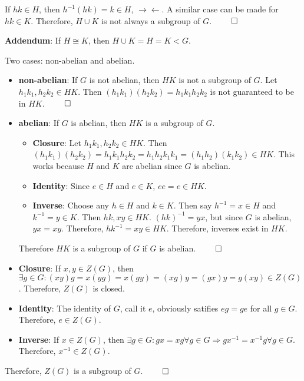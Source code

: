\documentclass[12pt]{report}
\begin{document}
If $hk \in H$, then $h^{-1}(hk) = k \in H$, $\rightarrow \leftarrow$. A similar case can be made for $hk \in K$.  Therefore, $H \cup K$ is not always a subgroup of $G$. $\qed$

\textbf{Addendum}: If $H \cong K$, then $H \cup K = H = K < G$.

\sol Two cases: non-abelian and abelian.
\begin{itemize}
    \item \textbf{non-abelian}: If $G$ is not abelian, then $HK$ is not a subgroup of $G$. Let $h_1k_1, h_2k_2 \in HK$. Then $(h_1k_1)(h_2k_2) = h_1k_1h_2k_2$ is not guaranteed to be in $HK$. $\qed$
    \item \textbf{abelian}: If $G$ is abelian, then $HK$ is a subgroup of $G$.
    \begin{itemize}
        \item \textbf{Closure}:  Let $h_1k_1, h_2k_2 \in HK$. Then $(h_1k_1)(h_2k_2) = h_1k_1h_2k_2 = h_1h_2k_1k_1 = (h_1h_2)(k_1k_2) \in HK$. This works because $H$ and $K$ are abelian since $G$ is abelian.
        \item \textbf{Identity}: Since $e \in H$ and $e \in K$, $ee = e \in HK$.
        \item \textbf{Inverse}: Choose any $h \in H$ and $k \in K$. Then say $h^{-1} = x \in H$ and $k^{-1} = y \in K$. Then $hk, xy \in HK$. $(hk)^{-1} = yx$, but since $G$ is abelian, $yx = xy$. Therefore, $hk^{-1} = xy \in HK$. Therefore, inverses exist in $HK$.
    \end{itemize}
    Therefore $HK$ is a subgroup of $G$ if $G$ is abelian. $\qed$
\end{itemize}

\sol 
\begin{itemize}
    \item \textbf{Closure}: If $x,y \in Z(G)$, then $\exists g \in G : (xy)g = x(yg) = x(gy) = (xg)y = (gx)y = g(xy) \in Z(G)$. Therefore, $Z(G)$ is closed. 
    \item \textbf{Identity}: The identity of $G$, call it $e$, obviously satifies $eg = ge$ for all $g \in G$. Therefore, $e \in Z(G)$.
    \item \textbf{Inverse}: If $x \in Z(G)$, then $\exists g \in G : gx = xg \forall g \in G \Rightarrow gx^{-1} = x^{-1}g \forall g \in G$. Therefore, $x^{-1} \in Z(G)$.
\end{itemize}
Therefore, $Z(G)$ is a subgroup of $G$. $\qed$
\end{document}
